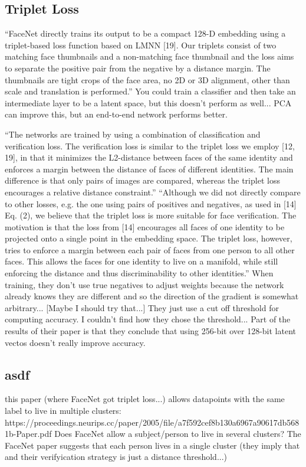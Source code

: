 \subsection{Triplet Loss}
``FaceNet directly trains
its output to be a compact 128-D embedding using a triplet-based loss function based on LMNN [19]. Our triplets consist of two matching face thumbnails and a non-matching
face thumbnail and the loss aims to separate the positive pair
from the negative by a distance margin. The thumbnails are
tight crops of the face area, no 2D or 3D alignment, other
than scale and translation is performed.''
You could train a classifier and then take an intermediate layer to be a latent space, but this doesn't perform as well...
PCA can improve this, but an end-to-end network performs better.
\cite{face_net}

``The networks are trained by using a combination of classification and verification loss. The verification
loss is similar to the triplet loss we employ [12, 19], in that it
minimizes the L2-distance between faces of the same identity and enforces a margin between the distance of faces of
different identities. The main difference is that only pairs of
images are compared, whereas the triplet loss encourages a
relative distance constraint.''
``Although we did not directly compare to other losses,
e.g. the one using pairs of positives and negatives, as used
in [14] Eq. (2), we believe that the triplet loss is more suitable for face verification. The motivation is that the loss
from [14] encourages all faces of one identity to be projected onto a single point in the embedding space. The
triplet loss, however, tries to enforce a margin between each
pair of faces from one person to all other faces. This allows the faces for one identity to live on a manifold, while
still enforcing the distance and thus discriminability to other
identities.''
When training, they don't use true negatives to adjust weights because the network already knows they are different and so the direction of the gradient is somewhat arbitrary...
[Maybe I should try that...]
They just use a cut off threshold for computing accuracy.
I couldn't find how they chose the threshold...
Part of the results of their paper is that they conclude that using 256-bit over 128-bit latent vectos doesn't really improve accuracy.

\subsection{asdf}
this paper (where FaceNet got triplet loss...) allows datapoints with the same label to live in multiple clusters:
https://proceedings.neurips.cc/paper/2005/file/a7f592cef8b130a6967a90617db5681b-Paper.pdf
Does FaceNet allow a subject/person to live in several clusters?
The FaceNet paper suggests that each person lives in a single cluster (they imply that and their verifyication strategy is just a distance threshold...)

